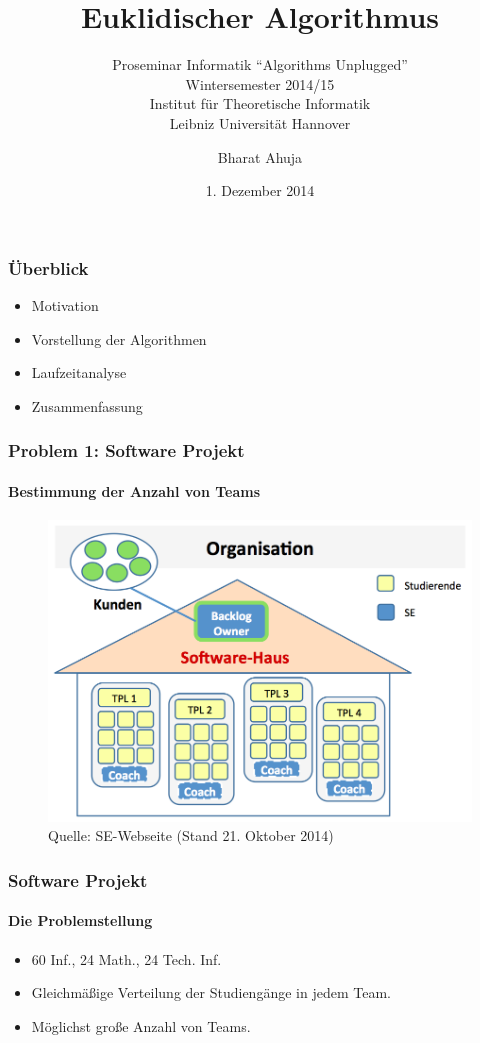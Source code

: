 \documentclass[•]{beamer}
\title{Euklidischer Algorithmus}
\subtitle{Proseminar Informatik ``Algorithms Unplugged''\\
Wintersemester 2014/15\\ 
Institut f\"ur Theoretische Informatik \\
Leibniz Universit\"at Hannover}
\date{1. Dezember 2014}
\author{Bharat Ahuja}
\begin{document}
\maketitle



\begin{frame}
\frametitle{\"Uberblick}
\begin{itemize}
	\item Motivation
	\item Vorstellung der Algorithmen
	\item Laufzeitanalyse
	\item Zusammenfassung
\end{itemize}
\end{frame}

\begin{frame}
	\frametitle{Problem 1: Software Projekt}
	\framesubtitle{Bestimmung der Anzahl von Teams}
	
	\begin{figure}
	\centering
	\includegraphics[scale=0.20]{Organisation}
	\caption*{\scriptsize{Quelle: SE-Webseite (Stand 21. Oktober 2014)}}
	\end{figure}
	
\end{frame}
	
\begin{frame}
	\frametitle{Software Projekt}
	\framesubtitle{Die Problemstellung}
	\begin{itemize}
	\pause 
		\item 60 Inf., 24 Math., 24 Tech. Inf.
		\pause 
		\item Gleichm\"a{\ss}ige Verteilung der Studieng\"ange in jedem Team.
		\pause 
		\item M\"oglichst gro{\ss}e Anzahl von Teams.
		\end{itemize}
\end{frame}
\end{document}

